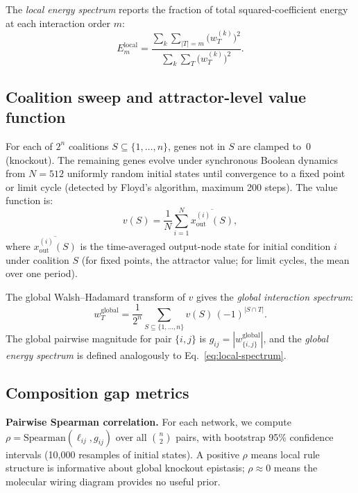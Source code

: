 \documentclass[11pt]{article}
\begin{document}
The \emph{local energy spectrum} reports the fraction of total
squared-coefficient energy at each interaction order $m$:
%
\begin{equation}
\label{eq:local-spectrum}
E_m^{\mathrm{local}} = \frac{\sum_k \sum_{|T|=m} \bigl(w_T^{(k)}\bigr)^2}
{\sum_k \sum_T \bigl(w_T^{(k)}\bigr)^2}.
\end{equation}


\subsection{Coalition sweep and attractor-level value function}
\label{sec:coalition-sweep}

For each of $2^n$ coalitions $S \subseteq \{1,\ldots,n\}$, genes not
in $S$ are clamped to~0 (knockout). The remaining genes evolve under
synchronous Boolean dynamics from $N = 512$ uniformly random initial
states until convergence to a fixed point or limit cycle (detected by
Floyd's algorithm, maximum 200 steps). The value function is:
%
\begin{equation}
\label{eq:value}
v(S) = \frac{1}{N} \sum_{i=1}^{N}
\overline{x_{\mathrm{out}}^{(i)}(S)},
\end{equation}
%
where $\overline{x_{\mathrm{out}}^{(i)}(S)}$ is the time-averaged
output-node state for initial condition $i$ under coalition $S$ (for
fixed points, the attractor value; for limit cycles, the mean over
one period).

The global Walsh--Hadamard transform of $v$ gives the
\emph{global interaction spectrum}:
%
\begin{equation}
\label{eq:global-wht}
w_T^{\mathrm{global}} = \frac{1}{2^n} \sum_{S \subseteq \{1,\ldots,n\}}
v(S)\,(-1)^{|S \cap T|}.
\end{equation}
%
The global pairwise magnitude for pair $\{i,j\}$ is
$g_{ij} = |w_{\{i,j\}}^{\mathrm{global}}|$, and the
\emph{global energy spectrum} is defined analogously to
Eq.~\ref{eq:local-spectrum}.


\subsection{Composition gap metrics}
\label{sec:metrics}

\textbf{Pairwise Spearman correlation.}
For each network, we compute
$\rho = \mathrm{Spearman}(\ell_{ij}, g_{ij})$ over all
$\binom{n}{2}$ pairs, with bootstrap 95\% confidence intervals
(10{,}000 resamples of initial states). A positive $\rho$ means local
rule structure is informative about global knockout epistasis; $\rho
\approx 0$ means the molecular wiring diagram provides no useful
prior.
\end{document}
